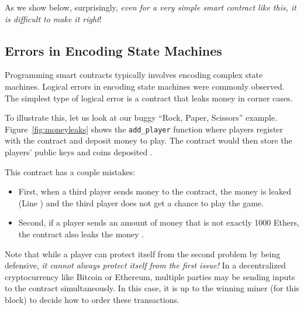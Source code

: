 \documentclass[10pt,twocolumn,letterpaper]{article}
\newcommand{\elaine}[1]{{\color{red}{[elaine: #1]}}}
\newcommand{\ignore}[1]{}
\begin{document}
As we show below, 
surprisingly, {\it even for a very simple smart contract like this, 
it is difficult 
to make it right}!

\elaine{emphasize this in the intro too.}


\ignore{
In this section, we'll explore the security and incentive alignment pitfalls in designing a smart contract. We'll use an easy-to-understand application as a running example, based on a Rock-Paper-Scissors game. We then analyze a plausible (but subtly buggy) initial implementation, pointing out its flaws. Mistakes resembling these were actually observed in our Smart Contract Programming Lab in ``CMSC 414 - Undergraduate Security''. vThis section is centered around the exercises. We provide hints to guide the reader towards discovering how to improve on them. Our ``reference'' solution can be found in the accompanying materials.
}


\subsection{Errors in Encoding State Machines}

Programming smart contracts typically involves
encoding complex state machines.
Logical errors
in encoding state machines were commonly observed.
The simplest type of logical error is a contract
that leaks money in corner cases.


To illustrate this, let us look at our buggy
``Rock, Paper, Scissors'' example.
Figure~\ref{fig:moneyleaks}
shows the {\tt add\_player} function
where players register with the contract and  
deposit money to play.
The contract would then store the players'
public keys 
and coins deposited \elaine{refer to line numbers}.

This contract has a couple mistakes:
\begin{itemize}[leftmargin=5mm]
\item
First, when a third player sends money to the contract,
the money is leaked (Line \elaine{refer}) 
and the third player does not get a chance
to play the game.
\item
Second, if a player sends an amount of money that is not
exactly 1000 Ethers, \elaine{make sure those names come out in the background section.}
the contract also leaks the money \elaine{refer to line number}.
\end{itemize}

Note that while a player 
can protect itself from the second problem by being defensive, 
{\it it cannot always protect 
itself from the first issue!}
In a decentralized cryptocurrency
like Bitcoin or Ethereum, 
multiple parties may be sending inputs 
to the contract simultaneously.
In this case, it is up to the winning miner
(for this block) to decide how to order these transactions.
\end{document}
